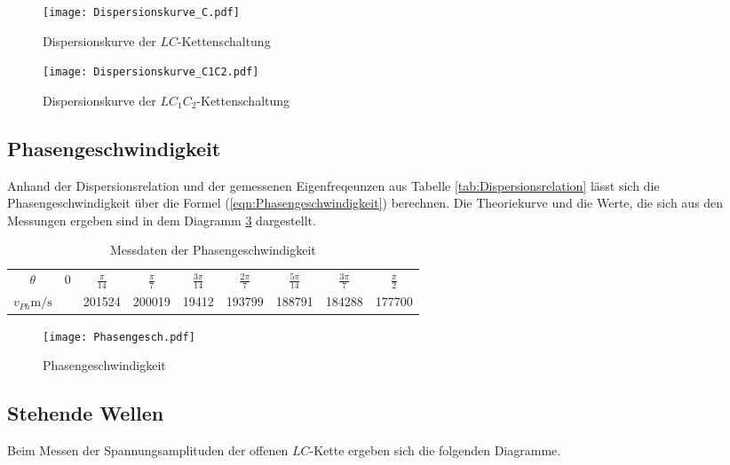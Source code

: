 \begin{figure}
  \texttt{[image: Dispersionskurve\_C.pdf]}
  \caption{Dispersionskurve der $LC$-Kettenschaltung}
  \label{fig:DispersionC}
\end{figure}
\begin{figure}
  \texttt{[image: Dispersionskurve\_C1C2.pdf]}
  \caption{Dispersionskurve der $LC_1C_2$-Kettenschaltung}
  \label{fig:DispersionC1C2}
\end{figure}
\FloatBarrier

\subsection{Phasengeschwindigkeit}

Anhand der Dispersionsrelation und der gemessenen Eigenfreqeunzen aus Tabelle
\ref{tab:Dispersionsrelation} lässt sich die Phasengeschwindigkeit über die
Formel (\eqref{eqn:Phasengeschwindigkeit}) berechnen.
Die Theoriekurve und die Werte, die sich aus den Messungen ergeben sind in
dem Diagramm \ref{fig:Phasengesch} dargestellt.

\FloatBarrier
\begin{table}
 \centering
 \begin{tabular}[width=\textwidth]{S| S S S S S S S S}
    \midrule
    $\theta$ & 0 & $\frac{\pi}{14}$ & $\frac{\pi}{7}$ & $\frac{3\pi}{14}$ & $\frac{2\pi}{7}$ & $\frac{5\pi}{14}$ & $\frac{3\pi}{7}$ & $\frac{\pi}{2}$ \\
    $v_{Ph}$$\si{\meter\per\second}$ & \text{\,\,\,\,\,\,\,\,\,\,\,\,\,\,\,\,--} & 201524 & 200019 & 19412 & 193799 & 188791 & 184288 & 177700 \\
    \bottomrule
\end{tabular}
  \caption{Messdaten der Phasengeschwindigkeit}
  \label{tab:Phasengesch}
\end{table}
\FloatBarrier

\begin{figure}
  \texttt{[image: Phasengesch.pdf]}
  \caption{Phasengeschwindigkeit}
  \label{fig:Phasengesch}
\end{figure}

\subsection{Stehende Wellen}

Beim Messen der Spannungsamplituden der offenen $LC$-Kette ergeben sich die folgenden
Diagramme.

